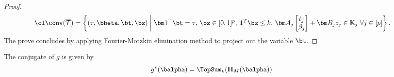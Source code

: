 \begin{proof}
    \begin{align*}
        \textstyle \cl \conv(\overline {\mathcal T}) = \left\{ (\tau, \bbeta, \bt, \bz) \;\middle|\; \bm 1^\top \bt = \tau, \, \bz \in [0, 1]^p, \, \mathbf{1}^T \bz \leq k, \, \bm A_j \begin{bmatrix} t_j \\ \beta_j \end{bmatrix} + \bm B_j z_j \in \mathbb K_j ~ \forall j \in [p] \right\}.
    \end{align*}
    The prove concludes by applying Fourier-Motzkin elimination method to project out the variable $\bt$.
\end{proof} 

\begin{namedlemma}
    [~\ref{lemma:fenchel_conjugate_of_g_closed_form_expression}]
    The conjugate of $g$ is given by
    \begin{equation*}
        g^*(\balpha) = \TopSum_k({\bf H}_M(\balpha)).
    \end{equation*}
\end{namedlemma}

